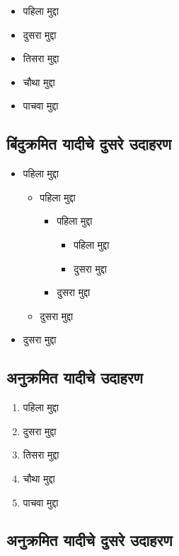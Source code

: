 \begin{itemize}
\item पहिला मुद्दा
\item दुसरा मुद्दा
\item तिसरा मुद्दा
\item चौथा मुद्दा
\item पाचवा मुद्दा
\end{itemize}

\subsection*{बिंदुक्रमित यादीचे दुसरे उदाहरण}

\begin{itemize}
\item पहिला मुद्दा
  \begin{itemize}
  \item पहिला मुद्दा
    \begin{itemize}
    \item पहिला मुद्दा
      \begin{itemize}
      \item पहिला मुद्दा
      \item दुसरा मुद्दा
      \end{itemize}
    \item दुसरा मुद्दा
    \end{itemize}
  \item दुसरा मुद्दा
  \end{itemize}
\item दुसरा मुद्दा
\end{itemize}

\subsection{अनुक्रमित यादीचे उदाहरण}

\begin{enumerate}
\item पहिला मुद्दा
\item दुसरा मुद्दा
\item तिसरा मुद्दा
\item चौथा मुद्दा
\item पाचवा मुद्दा
\end{enumerate}

\subsection*{अनुक्रमित यादीचे दुसरे उदाहरण}

